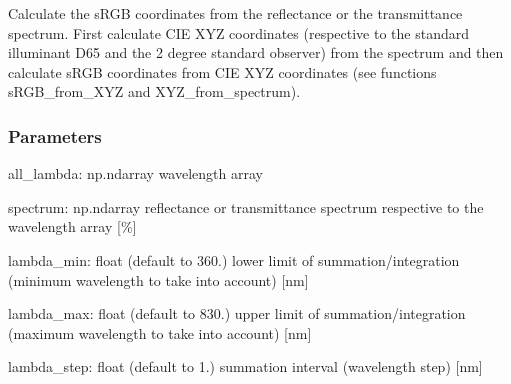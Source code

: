 \documentclass[letterpaper,10pt,english]{sphinxmanual}
\begin{document}

\begin{fulllineitems}
\label{\detokenize{07_colors:skinoptics.colors.sRGB_from_spectrum}}
\pysigstartsignatures
{}
\pysigstopsignatures
\sphinxAtStartPar
Calculate the sRGB coordinates from the reflectance or the transmittance spectrum.
First calculate CIE XYZ coordinates (respective to the standard illuminant D65 and
the 2 degree standard observer) from the spectrum and then calculate sRGB coordinates from
CIE XYZ coordinates (see functions sRGB\_from\_XYZ and XYZ\_from\_spectrum).


\subsubsection{Parameters}
\label{\detokenize{07_colors:id28}}
\sphinxAtStartPar
all\_lambda: np.ndarray
wavelength array

\sphinxAtStartPar
spectrum: np.ndarray
reflectance or transmittance spectrum respective to the wavelength array {[}\%{]}

\sphinxAtStartPar
lambda\_min: float (default to 360.)
lower limit of summation/integration (minimum wavelength to take into account) {[}nm{]}

\sphinxAtStartPar
lambda\_max: float (default to 830.)
upper limit of summation/integration (maximum wavelength to take into account) {[}nm{]}

\sphinxAtStartPar
lambda\_step: float (default to 1.)
summation interval (wavelength step) {[}nm{]}


\end{fulllineitems}
\end{document}
